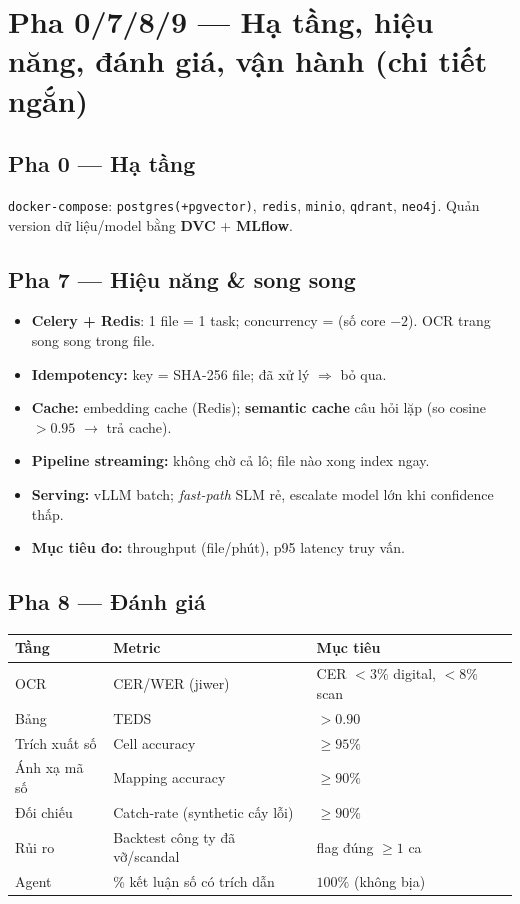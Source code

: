 \documentclass[11pt,a4paper]{article}
\begin{document}
\section{Pha 0/7/8/9 --- Hạ tầng, hiệu năng, đánh giá, vận hành (chi tiết ngắn)}

\subsection{Pha 0 --- Hạ tầng}
\texttt{docker-compose}: \texttt{postgres(+pgvector)}, \texttt{redis}, \texttt{minio}, \texttt{qdrant}, \texttt{neo4j}. Quản version dữ liệu/model bằng \textbf{DVC} + \textbf{MLflow}.

\subsection{Pha 7 --- Hiệu năng \& song song}
\begin{itemize}
  \item \textbf{Celery + Redis}: 1 file = 1 task; concurrency = (số core $-2$). OCR trang song song trong file.
  \item \textbf{Idempotency:} key = SHA-256 file; đã xử lý $\Rightarrow$ bỏ qua.
  \item \textbf{Cache:} embedding cache (Redis); \textbf{semantic cache} câu hỏi lặp (so cosine $>0.95$ $\rightarrow$ trả cache).
  \item \textbf{Pipeline streaming:} không chờ cả lô; file nào xong index ngay.
  \item \textbf{Serving:} vLLM batch; \emph{fast-path} SLM rẻ, escalate model lớn khi confidence thấp.
  \item \textbf{Mục tiêu đo:} throughput (file/phút), p95 latency truy vấn.
\end{itemize}

\subsection{Pha 8 --- Đánh giá}
\begin{longtable}{>{\raggedright\arraybackslash}p{4.2cm} >{\raggedright\arraybackslash}p{6.2cm} >{\raggedright\arraybackslash}p{4.2cm}}
\toprule
\textbf{Tầng} & \textbf{Metric} & \textbf{Mục tiêu} \\
\midrule
OCR & CER/WER (jiwer) & CER $<3\%$ digital, $<8\%$ scan \\
Bảng & TEDS & $>0.90$ \\
Trích xuất số & Cell accuracy & $\geq 95\%$ \\
Ánh xạ mã số & Mapping accuracy & $\geq 90\%$ \\
Đối chiếu & Catch-rate (synthetic cấy lỗi) & $\geq 90\%$ \\
Rủi ro & Backtest công ty đã vỡ/scandal & flag đúng $\geq 1$ ca \\
Agent & \% kết luận số có trích dẫn & $100\%$ (không bịa) \\
\bottomrule
\end{longtable}
\end{document}
